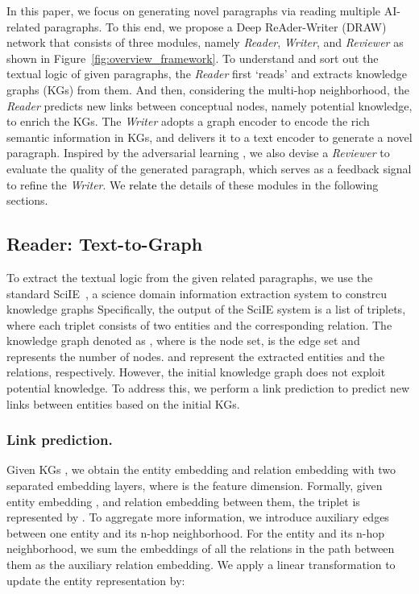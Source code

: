 \documentclass[letterpaper]{article}
\def\hmg{\textcolor{black}}
\begin{document}
In this paper, we focus on generating novel paragraphs via reading multiple AI-related paragraphs. To this end, we propose a Deep ReAder-Writer (DRAW) network that
consists of three modules, namely \textit{Reader}, \textit{Writer}, and \textit{Reviewer} as shown in Figure~\ref{fig:overview_framework}. 
To understand and sort out the textual logic of given paragraphs, the \textit{Reader} first `reads' and extracts {knowledge graphs} (KGs) from them. And then, considering the multi-hop neighborhood, the \textit{Reader} 
predicts new links between conceptual nodes, namely potential knowledge, to enrich the KGs.
The \textit{Writer} adopts a graph encoder to encode the rich semantic information in KGs, and delivers it to a text encoder to generate a novel paragraph.
{Inspired by the adversarial learning \cite{cao2019multi, wang2018graphgan, cao2020pami, Chen2020Generating}, }
we also devise a \textit{Reviewer} to evaluate the quality of the generated paragraph, which serves as a feedback signal to refine the \textit{Writer}.
We \hmg{relate} the details of these modules in the following sections.


\subsection{Reader: Text-to-Graph}
To extract the textual logic from the given related paragraphs, we use the standard SciIE~\cite{Luan2018MultiTaskIO}, a science domain information extraction system 
{to constrcu knowledge graphs}
Specifically, the output of the SciIE system is a list of triplets, where each triplet consists of two entities and the corresponding relation. 
The knowledge graph denoted as
, 
where  is the node set,  is the edge set and  represents the number of nodes.
 and  represent the extracted entities and the relations, respectively.
However, the initial knowledge graph  does not exploit potential knowledge.
To address this, we perform a link prediction to predict new links between entities based on the initial KGs.

\subsubsection{Link prediction.}
Given KGs , we obtain the entity embedding  and relation embedding  with two separated embedding layers, where  is the feature dimension.
Formally, given entity embedding ,  and relation embedding  between them, the triplet is represented by .
To aggregate more information, we introduce auxiliary edges between one entity and its n-hop neighborhood. For the entity and its n-hop neighborhood, we sum the embeddings of all the relations in the path between them as the auxiliary relation embedding.
We apply a linear transformation to update the entity representation  by:
\end{document}
